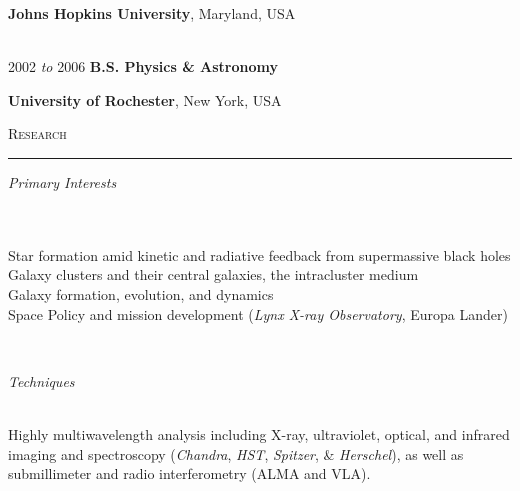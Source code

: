 \documentclass[11pt]{article}
\makeatletter
\def\vhrulefill#1{\leavevmode\leaders\hrule\@height#1\hfill \kern\z@}
\makeatother
\begin{document}
\hspace{42mm} \parbox{5.15in}{\textbf{Johns Hopkins University}, Maryland, USA} \\



\hspace{2.5mm} 2002 \textit{to} 2006 \hspace{17mm} {\textbf{B.S. Physics \& Astronomy}}

\hspace{42mm} \parbox{5.15in}{\textbf{University of Rochester}, New York, USA}



\textsc{Research}  \vhrulefill{0.4pt}

\vspace{2mm}

\hspace{2.5mm} \parbox{1.5in}{\textit{Primary Interests \\\\\\}} \parbox{5.15in}{Star formation amid kinetic and radiative feedback from supermassive black holes \\ Galaxy clusters and their central galaxies, the intracluster medium \\ Galaxy formation, evolution, and dynamics \\ Space Policy and mission development (\textit{Lynx X-ray Observatory}, Europa Lander)} \\


\vspace{3mm}


\hspace{2.5mm} \parbox{1.5in}{\textit{Techniques \\\\}} \parbox{5.15in}{Highly multiwavelength analysis including X-ray, ultraviolet, optical, and infrared imaging and spectroscopy (\textit{Chandra}, \textit{HST}, \textit{Spitzer}, \& \textit{Herschel}), as well as submillimeter and radio interferometry (ALMA and VLA).  } \\

\vspace*{-2mm}
\end{document}
